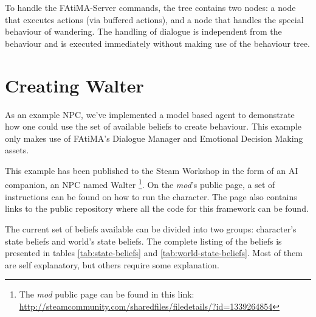To handle the FAtiMA-Server commands, the tree contains two nodes: a node that executes actions (via buffered actions), and a node that handles the special behaviour of wandering.
The handling of dialogue is independent from the behaviour and is executed immediately without making use of the behaviour tree.

\section{Creating Walter}

\noindent As an example \ac{NPC}, we've implemented a model based agent to demonstrate how one could use the set of available beliefs to create behaviour.
This example only makes use of FAtiMA's Dialogue Manager and Emotional Decision Making assets.

This example has been published to the Steam Workshop in the form of an \ac{AI} companion, an \ac{NPC} named Walter \footnote{The \textit{mod} public page can be found in this link: \href{http://steamcommunity.com/sharedfiles/filedetails/?id=1339264854}{http://steamcommunity.com/sharedfiles/filedetails/?id=1339264854}}.
On the \textit{mod}'s public page, a set of instructions can be found on how to run the character.
The page also contains links to the public repository where all the code for this framework can be found.



The current set of beliefs available can be divided into two groups: character's state beliefs and world's state beliefs.
The complete listing of the beliefs is presented in tables \ref{tab:state-beliefs} and \ref{tab:world-state-beliefs}.
Most of them are self explanatory, but others require some explanation.

